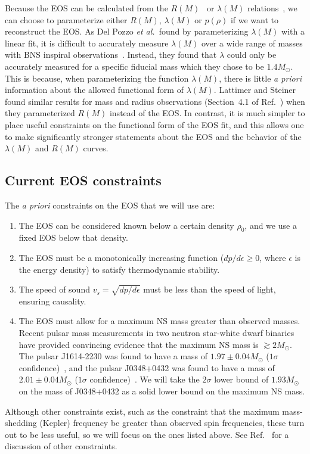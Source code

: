 \documentclass[twocolumn,prd,amssymb,aps,nofootinbib,showpacs,epsf]{revtex4}
\begin{document}
Because the EOS can be calculated from the $R(M)$~\cite{Lindblom1992} or $\lambda(M)$ relations~\cite{LindblomIndik2012, LindblomIndik2014}, we can choose to parameterize either $R(M)$, $\lambda(M)$ or $p(\rho)$ if we want to reconstruct the EOS. As Del Pozzo {\it et al.}\ found by parameterizing $\lambda(M)$ with a linear fit, it is difficult to accurately measure $\lambda(M)$ over a wide range of masses with BNS inspiral observations~\cite{DelPozzoLiAgathos2013}. Instead, they found that $\lambda$ could only be accurately measured for a specific fiducial mass which they chose to be $1.4M_\odot$. This is because, when parameterizing the function $\lambda(M)$, there is little {\it a priori} information about the allowed functional form of $\lambda(M)$. Lattimer and Steiner found similar results for mass and radius observations (Section~4.1 of Ref.~\cite{LattimerSteiner2014}) when they parameterized $R(M)$ instead of the EOS. In contrast, it is much simpler to place useful constraints on the functional form of the EOS fit, and this allows one to make significantly stronger statements about the EOS and the behavior of the $\lambda(M)$ and $R(M)$ curves.

\subsection{Current EOS constraints}
\label{sec:eosconstraints}

The {\it a priori} constraints on the EOS that we will use are:
\begin{enumerate}
\item The EOS can be considered known below a certain density $\rho_0$, and we use a fixed EOS below that density.
\item The EOS must be a monotonically increasing function ($dp/d\epsilon \ge 0$, where $\epsilon$ is the energy density) to satisfy thermodynamic stability.
\item The speed of sound $v_s = \sqrt{dp/d\epsilon}$ must be less than the speed of light, ensuring causality. 
\item The EOS must allow for a maximum NS mass greater than observed masses. Recent pulsar mass measurements in two neutron star-white dwarf binaries have provided convincing evidence that the maximum NS mass is $\gtrsim 2M_\odot$. The pulsar J1614-2230 was found to have a mass of $1.97\pm0.04M_\odot$ ($1\sigma$ confidence)~\cite{DemorestPennucciRansom2010}, and the pulsar J0348+0432 was found to have a mass of $2.01\pm0.04M_\odot$ ($1\sigma$ confidence)~\cite{AntoniadisFreireWex2013}. We will take the $2\sigma$ lower bound of $1.93M_\odot$ on the mass of J0348+0432 as a solid lower bound on the maximum NS mass.
\end{enumerate}
Although other constraints exist, such as the constraint that the maximum mass-shedding (Kepler) frequency be greater than observed spin frequencies, these turn out to be less useful, so we will focus on the ones listed above. See Ref.~\cite{ReadLackey2009} for a discussion of other constraints.
\end{document}
